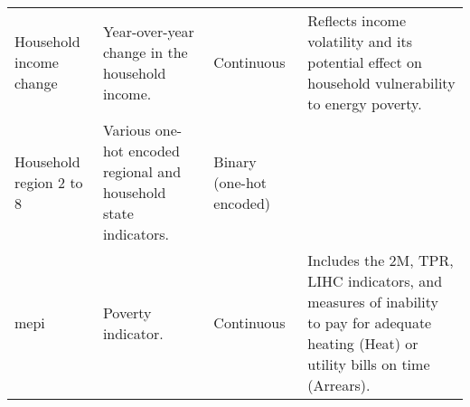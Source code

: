 \begin{sidewaystable}[!htbp]
\begin{adjustbox}{totalheight=0.9\textheight, width=\textwidth, keepaspectratio}
\begin{tabularx}{1.4\textwidth}{lXXX}
Household income change & Year-over-year change in the household income.                              & Continuous               & Reflects income volatility and its potential effect on household vulnerability to energy poverty. \\
Household region 2 to 8           & Various one-hot encoded regional and household state indicators. & Binary (one-hot encoded) &  \\
\Gls{mepi}                    & Poverty indicator.                                                          & Continuous               & Includes the 2M, TPR, LIHC indicators, and measures of inability to pay for adequate heating (Heat) or utility bills on time (Arrears). \\
\bottomrule
\end{tabularx}
\end{adjustbox}
\end{sidewaystable}